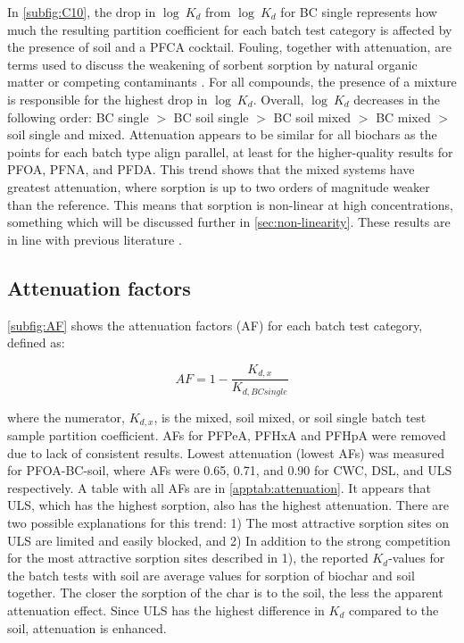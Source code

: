 In \cref{subfig:C10}, the drop in $\log~K_d$ from $\log~K_d$ for BC single represents how much the resulting partition coefficient for each batch test category is affected by the presence of soil and a PFCA cocktail. Fouling, together with attenuation, are terms used to discuss the weakening of sorbent sorption by natural organic matter or competing contaminants \citep{Werner2006}. For all compounds, the presence of a mixture is responsible for the highest drop in $\log~K_d$. Overall, $\log~K_d$ decreases in the following order: BC single $>$ BC soil single $>$ BC soil mixed $>$ BC mixed $>$ soil single and mixed. Attenuation appears to be similar for all biochars as the points for each batch type align parallel, at least for the higher-quality results for PFOA, PFNA, and PFDA. This trend shows that the mixed systems have greatest attenuation, where sorption is up to two orders of magnitude weaker than the reference. This means that sorption is non-linear at high concentrations, something which will be discussed further in \cref{sec:non-linearity}. These results are in line  with previous literature \citep{deng2010removal, zhou2010sorption}.

\subsection{Attenuation factors}
\cref{subfig:AF} shows the attenuation factors (AF) for each batch test category, defined as:

\begin{equation} \label{eq:AF}
    AF = 1 - \frac{K_{d,x}}{K_{d,BC single}}
\end{equation}

where the numerator, $K_{d,x}$, is the mixed, soil mixed, or soil single batch test sample partition coefficient. AFs for PFPeA, PFHxA and PFHpA were removed due to lack of consistent results. Lowest attenuation (lowest AFs) was measured for PFOA-BC-soil, where AFs were 0.65, 0.71, and 0.90 for CWC, DSL, and ULS respectively. A table with all AFs are in \cref{apptab:attenuation}. It appears that ULS, which has the highest sorption, also has the highest attenuation. There are two possible explanations for this trend: 1) The most attractive sorption sites on ULS are limited and easily blocked, and 2) In addition to the strong competition for the most attractive sorption sites described in 1), the reported $K_d$-values for the batch tests with soil are average values for sorption of biochar and soil together. The closer the sorption of the char is to the soil, the less the apparent attenuation effect. Since ULS has the highest difference in $K_d$ compared to the soil, attenuation is enhanced.

